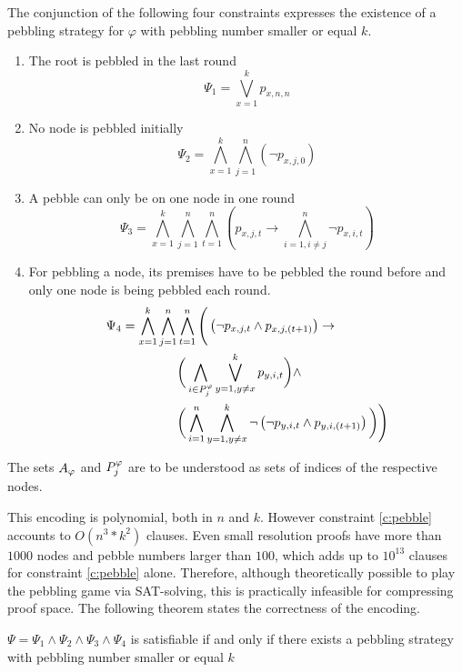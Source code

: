 \begin{definition}[Pebbling SAT encoding]
The conjunction of the following four constraints expresses the existence of a pebbling strategy for $\varphi$ with pebbling number smaller or equal $k$.

\begin{enumerate}
	\item The root is pebbled in the last round
				$$\Psi_1 = \bigvee_{x = 1}^k p_{x,n,n}$$
				
	\item No node is pebbled initially\\
				$$\Psi_2 = \bigwedge_{x = 1}^k \bigwedge_{j = 1}^n \left(\neg p_{x,j,0} \right)$$

	\item A pebble can only be on one node in one round
				$$\Psi_3 = \bigwedge_{x = 1}^k \bigwedge_{j = 1}^n \bigwedge_{t = 1}^n \left( p_{x,j,t} \rightarrow \bigwedge_{i = 1, i \neq j}^n \neg p_{x,i,t} \right)$$ 
				
	\item \label{c:pebble} For pebbling a node, its premises have to be pebbled the round before and only one node is being pebbled each round.\\
				\begin{align*}
					\Psi_4 = \bigwedge_{x = 1}^k \bigwedge_{j = 1}^n & \bigwedge_{t = 1}^n  \Bigg( \left(\neg p_{x,j,t} \wedge p_{x,j,(t+1)} \right)\rightarrow \\
					&\bigg( \bigwedge_{i \in P_{j}^{\varphi}} \bigvee_{y = 1, y \neq x}^k p_{y,i,t} \bigg) \wedge \\
					&\bigg( \bigwedge_{i = 1}^n \bigwedge_{y = 1, y \neq x}^k \neg \left( \neg p_{y,i,t} \wedge p_{y,i,(t+1)} \right) \bigg) \Bigg)
				\end{align*}
				
\end{enumerate}

The sets $A_{\varphi}$ and $P_{j}^{\varphi}$ are to be understood as sets of indices of the respective nodes.

\end{definition}

\noindent
This encoding is polynomial, both in $n$ and $k$. However constraint \ref{c:pebble} accounts to $O(n^3*k^2)$ clauses. 
Even small resolution proofs have more than $1000$ nodes and pebble numbers larger than $100$, which adds up to $10^{13}$ clauses for constraint \ref{c:pebble} alone. 
Therefore, although theoretically possible to play the pebbling game via SAT-solving, this is practically infeasible for compressing proof space.
The following theorem states the correctness of the encoding.

\begin{proposition}

$\Psi = \Psi_1 \wedge \Psi_2 \wedge \Psi_3 \wedge \Psi_4$ is satisfiable if and only if there exists a pebbling strategy with pebbling number smaller or equal $k$

\end{proposition}